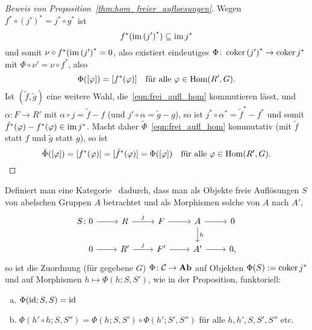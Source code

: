 \begin{proof}[Beweis von Proposition~\ref{thm:hom_freier_aufloesungen}]
  Wegen $f^* \circ {(j')}^* = j^* \circ g^*$ ist
  \begin{equation*}
    f^* (\operatorname{im} {(j')} ^*) \subseteq \operatorname{im} j^*
  \end{equation*}
  und somit $\nu \circ f^* (\operatorname{im} {(j')}^* = 0$, also existiert eindeutiges $\Phi \colon \operatorname{coker} {(j')}^* \to \operatorname{coker} j^*$ mit $\Phi \circ \nu' = \nu \circ f^*$, also
  \begin{equation*}
    \Phi([\varphi]) = [f^*(\varphi)] \quad \text{für alle $\varphi \in \mathrm{Hom}(R',G)$}.
  \end{equation*}
  Ist $(\tilde f, \tilde g)$ eine weitere Wahl, die~\eqref{eqn:frei_aufl_hom} kommutieren lässt, und $\alpha \colon F \to R'$ mit $\alpha \circ j = \tilde f - f$ (und $j' \circ \alpha = \tilde g - g$), so ist $j^* \circ \alpha^* = {\tilde f}^* - f^*$ und somit ${\tilde f}^* (\varphi) - f^*(\varphi) \in \operatorname{im} j^*$.
  Macht daher $\tilde\Phi$~\eqref{eqn:frei_aufl_hom} kommutativ (mit $\tilde f$ statt $f$ und $\tilde g$ statt $g$), so ist
  \begin{equation*}
    \tilde\Phi ([\varphi]) = [f^*(\varphi)] = [{\tilde f}^*(\varphi)] = \Phi ([\varphi]) \quad \text{für alle $\varphi \in \mathrm{Hom}(R',G)$}.
  \end{equation*}
\end{proof}
\begin{korollar}
  Definiert man eine Kategorie \C\ dadurch, dass man als Objekte freie Auflösungen $S$ von abelschen Gruppen $A$ betrachtet und als Morphismen solche von $A$ nach $A'$,
  \begin{equation*}
    \begin{tikzcd}
      S\colon 0 \arrow{r}{}  & R \arrow{r}{j}  & F \arrow{r}{} & A \arrow{d}{h}
                                                              \arrow{r}{}   & 0 \\
      \phantom{S\colon}
      0 \arrow{r}{}  & R'\arrow{r}{j}  & F'\arrow{r}{} & A'\arrow{r}{}   & 0,
    \end{tikzcd}
  \end{equation*}
  so ist die Zuordnung (für gegebene $G$) $\Phi \colon \mathcal{C} \to \mathbf{Ab}$ auf Objekten $\Phi(S) := \operatorname{coker} j^*$ und auf Morphismen $h \mapsto \Phi(h;S,S')$, wie in der Proposition, funktoriell:
  \begin{enumerate}[(a)]
    \item 
      $\Phi(\operatorname{id};S,S) = \operatorname{id}$
    \item
      $\Phi(h' \circ h;S,S'') = \Phi(h;S,S') \circ \Phi(h';S',S'')$ für alle $h,h',S,S',S''$ etc.
    \end{enumerate}
\end{korollar}
